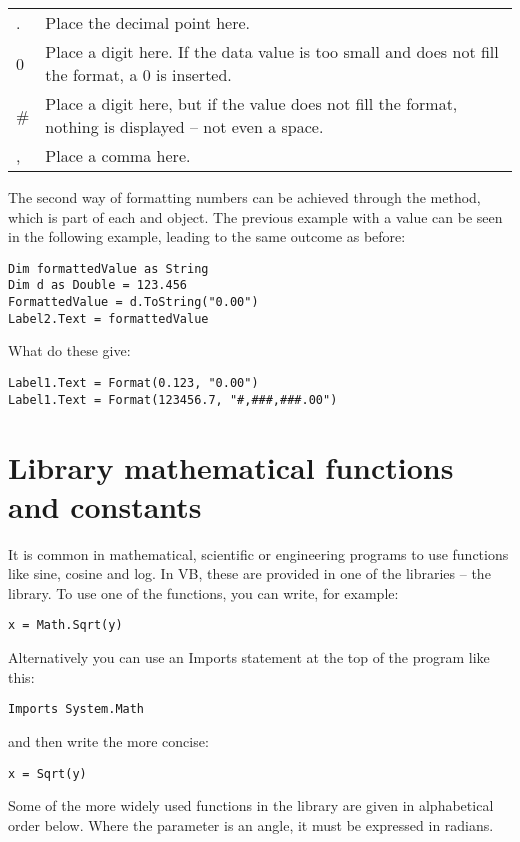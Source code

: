 		\begin{center}
			\begin{tabular}{lp{10cm}}
				\toprule
				.	& Place the decimal point here.\\
				0	& Place a digit here. If the data value is too small and does not fill the format, a 0 is inserted.\\
				\#	& Place a digit here, but if the value does not fill the format, nothing is displayed – not even a space.\\
				, &	Place a comma here.\\ \bottomrule
			\end{tabular}
		\end{center}

		The second way of formatting numbers can be achieved through the  method, which is part of each  and  object. The previous example with a  value can be seen in the following example, leading to the same outcome as before:	
		\begin{lstlisting}
Dim formattedValue as String
Dim d as Double = 123.456
FormattedValue = d.ToString("0.00")
Label2.Text = formattedValue
		\end{lstlisting}




		\begin{stqb}
			\begin{STQ}
			\item What do these give:
				\begin{lstlisting}
Label1.Text = Format(0.123, "0.00")
Label1.Text = Format(123456.7, "#,###,###.00")	
				\end{lstlisting}
			\end{STQ}
		\end{stqb}


	\section{Library mathematical functions and constants}
		It is common in mathematical, scientific or engineering programs to use functions like sine, cosine and log. In VB, these are provided in one of the libraries – the  library. To use one of the functions, you can write, for example:
		\begin{lstlisting}
x = Math.Sqrt(y)
		\end{lstlisting}
		Alternatively you can use an Imports statement at the top of the program like this:
		\begin{lstlisting}
Imports System.Math
		\end{lstlisting}
		and then write the more concise:
		\begin{lstlisting}
x = Sqrt(y)
		\end{lstlisting}
		Some of the more widely used functions in the  library are given in alphabetical order below. Where the parameter is an angle, it must be expressed in radians.

